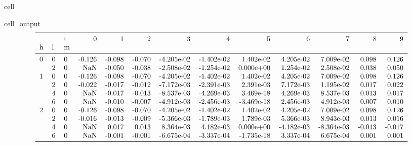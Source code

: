 \documentclass[letterpaper,table,10pt,english]{jupyterBook}
\begin{document}
\begin{sphinxuseclass}{cell}
\begin{sphinxVerbatimOutput}
\begin{sphinxuseclass}{cell_output}\begin{equation*}
\begin{split}\begin{tabular}{lllrrrrrrrrrr}
\toprule
  &   & t &      0 &      1 &      2 &          3 &          4 &          5 &          6 &          7 &      8 &      9 \\
h & l & m &        &        &        &            &            &            &            &            &        &        \\
\midrule
0 & 0 & 0 & -0.126 & -0.098 & -0.070 & -4.205e-02 & -1.402e-02 &  1.402e-02 &  4.205e-02 &  7.009e-02 &  0.098 &  0.126 \\
  & 2 & 0 &    NaN & -0.050 & -0.038 & -2.508e-02 & -1.254e-02 &  0.000e+00 &  1.254e-02 &  2.508e-02 &  0.038 &  0.050 \\
1 & 0 & 0 & -0.126 & -0.098 & -0.070 & -4.205e-02 & -1.402e-02 &  1.402e-02 &  4.205e-02 &  7.009e-02 &  0.098 &  0.126 \\
  & 2 & 0 & -0.022 & -0.017 & -0.012 & -7.172e-03 & -2.391e-03 &  2.391e-03 &  7.172e-03 &  1.195e-02 &  0.017 &  0.022 \\
  & 4 & 0 &    NaN & -0.017 & -0.013 & -8.537e-03 & -4.269e-03 &  3.469e-18 &  4.269e-03 &  8.537e-03 &  0.013 &  0.017 \\
  & 6 & 0 &    NaN & -0.010 & -0.007 & -4.912e-03 & -2.456e-03 & -3.469e-18 &  2.456e-03 &  4.912e-03 &  0.007 &  0.010 \\
2 & 0 & 0 & -0.126 & -0.098 & -0.070 & -4.205e-02 & -1.402e-02 &  1.402e-02 &  4.205e-02 &  7.009e-02 &  0.098 &  0.126 \\
  & 2 & 0 & -0.016 & -0.013 & -0.009 & -5.366e-03 & -1.789e-03 &  1.789e-03 &  5.366e-03 &  8.943e-03 &  0.013 &  0.016 \\
  & 4 & 0 &    NaN &  0.017 &  0.013 &  8.364e-03 &  4.182e-03 &  0.000e+00 & -4.182e-03 & -8.364e-03 & -0.013 & -0.017 \\
  & 6 & 0 &    NaN & -0.001 & -0.001 & -6.675e-04 & -3.337e-04 & -1.735e-18 &  3.337e-04 &  6.675e-04 &  0.001 &  0.001 \\
\bottomrule
\end{tabular}\end{split}
\end{equation*}
\end{sphinxuseclass}\end{sphinxVerbatimOutput}

\end{sphinxuseclass}
\end{document}
